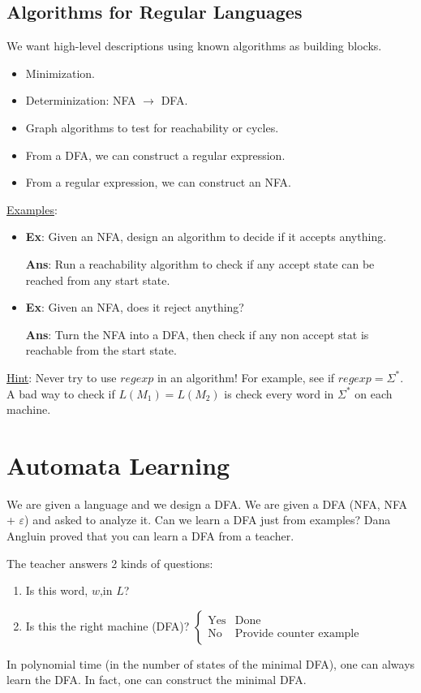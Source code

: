 \documentclass{article}
\begin{document}
\subsection{Algorithms for Regular Languages}
We want high-level descriptions using known algorithms as building blocks.
\begin{itemize}
    \item Minimization.
    \item Determinization: NFA $\rightarrow$ DFA.
    \item Graph algorithms to test for reachability or cycles.
    \item From a DFA, we can construct a regular expression.
    \item From a regular expression, we can construct an NFA.
\end{itemize}
\underline{Examples}:
\begin{itemize}
    \item \textbf{Ex}: Given an NFA, design an algorithm to decide if it accepts anything.
    
    \textbf{Ans}: Run a reachability algorithm to check if any accept state can be reached from any start state.
    \item \textbf{Ex}: Given an NFA, does it reject anything?
    
    \textbf{Ans}: Turn the NFA into a DFA, then check if any non accept stat is reachable from the start state.
\end{itemize}
\underline{Hint}: Never try to use $regexp$ in an algorithm! For example, see if $regexp = \Sigma^*$. A bad way to check if $L(M_1) = L(M_2)$ is check every word in $\Sigma^*$ on each machine.
\section{Automata Learning}
We are given a language and we design a DFA. We are given a DFA (NFA, NFA + $\varepsilon$) and asked to analyze it. Can we learn a DFA just from examples? Dana Angluin proved that you can learn a DFA from a teacher.

The teacher answers 2 kinds of questions:
\begin{enumerate}
    \item Is this word, $w$,in $L$?
    \item Is this the right machine (DFA)?
    $\begin{cases}
    \text{Yes} & \text{Done}\\
    \text{No} & \text{Provide counter example}
    \end{cases}$
\end{enumerate}
In polynomial time (in the number of states of the minimal DFA), one can always learn the DFA. In fact, one can construct the minimal DFA.
\end{document}

